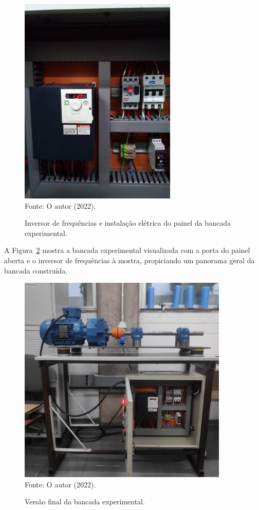 \documentclass[
	12pt,				
	oneside,			
	a4paper,			
	english,			
	brazil,			
	]{abntex2ppgsi}
\begin{document}
\begin{figure}[H]
\centering
\caption {Inversor de frequências e instalação elétrica do painel da bancada experimental.}
\includegraphics[width=\textwidth,height=100mm,keepaspectratio,angle=-90]{painel_por_dentro} \\
Fonte: O autor (2022).
\label{painel_por_dentro}
\end{figure}

A Figura~\ref{bancada_aberta} mostra a bancada experimental visualizada com a porta do painel aberta e o inversor de frequências à mostra, propiciando um panorama geral da bancada construída.
 
\begin{figure}[H]
\centering
\caption {Versão final da bancada experimental.}
\includegraphics[width=\textwidth,height=100mm,keepaspectratio]{bancada_aberta} \\
Fonte: O autor (2022).
\label{bancada_aberta}
\end{figure}
  
\end{document}
